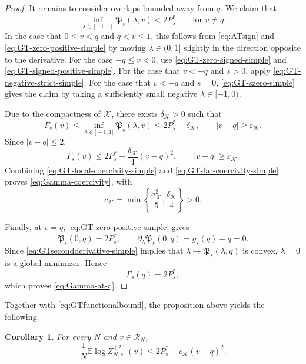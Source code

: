 \documentclass[11pt]{article}
\newtheorem{corollary}[theorem]{Corollary}
\numberwithin{equation}{section}
\newcommand{\E}{\mathbb{E}}
\newcommand{\1}{\mathbf 1}
\newcommand{\cK}{\mathcal K}
\begin{document}
\begin{proof}
It remains to consider overlaps bounded away from $q$.  We claim that
\begin{equation}
\inf_{\lambda\in [-1,1]}
 \mathfrak P_s(\lambda,v)<2P_s^*
 \qquad\text{for }v\ne q.
 \label{eq:GT-pointwise-gap-simple}
\end{equation}
In the case that $0\le v<q$ and $q<v\le1$, this follows from  \eqref{eq:ATsign} and \eqref{eq:GT-zero-positive-simple}  by moving
$\lambda\in (0,1]$ slightly in the direction opposite to the derivative.
For the case $-q\le v<0$, use \eqref{eq:GT-zero-signed-simple} and \eqref{eq:GT-signed-positive-simple}.
For the case that $v<-q$ and $s>0$, apply \eqref{eq:GT-negative-strict-simple}.
For the case that $v<-q$ and $s=0$, \eqref{eq:GT-szero-simple} gives the claim by taking a sufficiently small negative $\lambda\in [-1,0)$.

Due to the compactness of $\cK$, there exists $\delta _{\cK}>0$ such that
\[
 \Gamma_s(v)\le \inf_{\lambda\in\mathbb [-1,1]}
 \mathfrak P_s(\lambda,v)\le2P_s^*-\delta _{\cK},
 \qquad |v-q|\ge\varepsilon_{\cK}.
\]
Since $|v-q|\le2$,
\begin{equation}
 \Gamma_s(v)
 \le
 2P_s^*-\frac{\delta _{\cK}}4(v-q)^2,
 \qquad |v-q|\ge\varepsilon_{\cK}.
 \label{eq:GT-far-coercivity-simple}
\end{equation}
Combining \eqref{eq:GT-local-coercivity-simple} and
\eqref{eq:GT-far-coercivity-simple} proves
\eqref{eq:Gamma-coercivity}, with
\[
 c_{\cK}
 =
 \min\left\{
 \frac{a_{\cK}^2}{5},
 \frac{\delta _{\cK}}4
 \right\}>0.
\]

Finally, at $v=q$, \eqref{eq:GT-zero-positive-simple} gives
\[
 \mathfrak P_s(0,q)=2P_s^*,
 \qquad
 \partial_\lambda\mathfrak P_s(0,q)=g_s(q)-q=0.
\]
Since \eqref{eq:GTsecondderivative-simple} implies that $\lambda\mapsto\mathfrak P_s(\lambda,q)$ is convex, $\lambda=0$ is
a global minimizer.  Hence
\[
 \Gamma_s(q)=2P_s^*,
\]
which proves \eqref{eq:Gamma-at-q}.
\end{proof}
Together with \eqref{eq:GTfunctionalbound}, the proposition above yields the following. 
\begin{corollary}
        For every $N$ and $v\in\mathcal R_N$,
\begin{equation}
 \frac1N\E\log Z^{(2)}_{N,s}(v)
 \le 2P_s^*-c_{\cK}(v-q)^2.
 \label{eq:GTcoercivity}
\end{equation}
\end{corollary}
\end{document}
